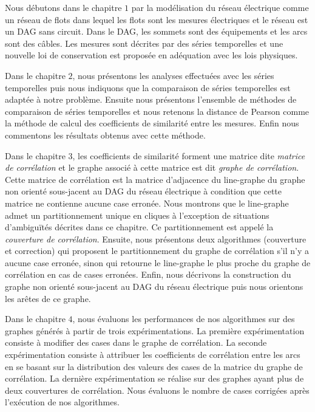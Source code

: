 Nous d\'ebutons dans le chapitre $ 1 $ par la mod\'elisation du r\'eseau \'electrique comme un r\'eseau de flots dans lequel les flots sont les mesures \'electriques et le r\'eseau est un DAG sans circuit. Dans le DAG, les sommets sont des \'equipements et les arcs sont des c\^ables. Les mesures sont d\'ecrites par des s\'eries temporelles et une nouvelle loi de conservation \cite{loiDeConservation} est propos\'ee en ad\'equation avec les lois physiques.
 \newline
 
 Dans le chapitre $ 2 $, nous pr\'esentons les analyses effectu\'ees avec les s\'eries temporelles puis  nous indiquons que la comparaison de s\'eries temporelles est adapt\'ee \`a notre probl\`eme. Ensuite nous pr\'esentons l'ensemble de m\'ethodes de comparaison de s\'eries temporelles et nous retenons la distance de Pearson comme la m\'ethode de calcul des coefficients de similarit\'e  entre les mesures. Enfin nous commentons les r\'esultats obtenus avec cette m\'ethode.
 \newline
 
 Dans le chapitre $ 3 $, les coefficients de similarit\'e forment une matrice dite {\em matrice de corr\'elation} et le graphe associ\'e \`a cette matrice est dit {\em graphe de corr\'elation}. Cette matrice de corr\'elation est la matrice d'adjacence du line-graphe du graphe non orient\'e sous-jacent au DAG du r\'eseau \'electrique \`a condition que cette matrice ne contienne aucune case erron\'ee. Nous montrons que le line-graphe admet un partitionnement unique en cliques \`a l'exception de situations d'ambigu\"{i}t\'es d\'ecrites dans ce chapitre. Ce partitionnement est appel\'e la {\em couverture de corr\'elation}.  
 Ensuite, nous pr\'esentons deux algorithmes (couverture et correction) qui proposent le partitionnement du graphe de corr\'elation s'il n'y a aucune case erron\'ee, sinon qui retourne le line-graphe le plus proche du graphe de corr\'elation en cas de cases erron\'ees.
 Enfin, nous d\'ecrivons la construction du graphe non orient\'e sous-jacent au DAG du r\'eseau \'electrique puis nous orientons les ar\^etes de ce graphe.
 \newline
 
 Dans le chapitre $ 4 $, nous \'evaluons les performances de nos algorithmes sur des graphes g\'en\'er\'es  \`a partir de trois exp\'erimentations. La premi\`ere exp\'erimentation consiste \`a modifier des cases dans le graphe de corr\'elation. La seconde exp\'erimentation consiste \`a attribuer les coefficients de corr\'elation entre les arcs en se basant sur la distribution des valeurs des cases de la matrice du graphe de corr\'elation. La derni\`ere  exp\'erimentation se r\'ealise sur des graphes ayant plus de deux couvertures de corr\'elation. 
Nous \'evaluons le nombre de cases corrig\'ees apr\`es l'ex\'ecution de nos algorithmes.
 
